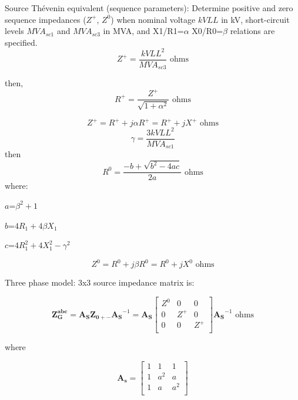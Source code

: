 \documentclass[12pt]{article}
\begin{document}
Source Th\'evenin equivalent (sequence parameters):
Determine positive and zero sequence impedances (${Z}^{+}$, ${Z}^{0}$) when nominal voltage $kVLL$ in kV, short-circuit levels $MVA_{sc1}$ and $MVA_{sc3}$ in MVA, and X1/R1=$\alpha$ X0/R0=$\beta$ relations are specified.
\begin{equation}
Z^{+}=\frac{kVLL^2}{MVA_{sc3}}\mbox{ ohms}
\end{equation}

then,
\begin{equation}
R^{+}=\frac{Z^{+}}{\sqrt{1+\alpha^2}}\mbox{ ohms}
\end{equation}

\begin{equation}
{Z}^{+}={R^{+}}+j{\alpha R^{+}}={R^{+}}+j{X^{+}}\mbox{ ohms}
\end{equation}
\begin{equation}
\gamma=\frac{3 kVLL^2}{MVA_{sc1}}
\end{equation}
then
\begin{equation}
R^{0}=\frac{-b+\sqrt{b^2-4ac}}{2a}\mbox{ ohms}
\end{equation}
where:

$a$=$\beta^2+1$

$b$=$4R_1+4 \beta X_1$

$c$=$4R_1^2+4X_1^2-\gamma^2$

\begin{equation}
{Z}^{0}={R^{0}}+j{\beta R^{0}}={R^{0}}+j{X^{0}}\mbox{ ohms}
\end{equation}

Three phase model: 3x3 source impedance matrix is:

\begin{equation}
\mathbf{Z^{abc}_{G}}=\mathbf{A_S}
\mathbf{Z_{0+-}}
    \mathbf{A_S}^{-1}=\mathbf{A_S}
\left[ \begin{array}{ccc}
               {Z}^{0} & 0 &0\\
               0 & {Z}^{+} & 0  \\
               0 & 0 & {Z}^{+}  \\
             \end{array}
           \right] \mathbf{A_S}^{-1}
           \mbox{ ohms}
\end{equation}

where

\begin{equation}
\mathbf{A_s}=
\left[ \begin{array}{ccc}
               1 & 1 &1\\
               1 & a^2 & a  \\
               1 & a & a^2   \\
             \end{array}
           \right]
           \end{equation}
\end{document}
